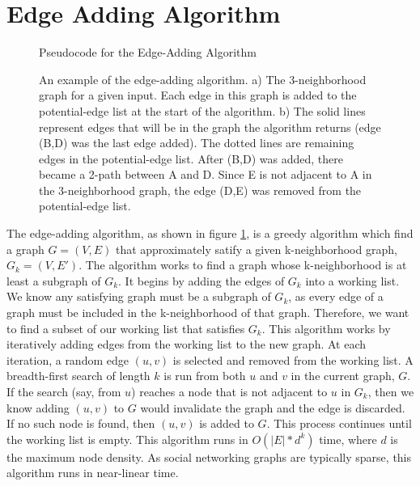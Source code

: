 \section{Edge Adding Algorithm}


\begin{figure}[H]
	\begin{algorithmic}
		\renewcommand{\algorithmicrequire}{\textbf{Input:}}
		\renewcommand{\algorithmicensure}{\textbf{Output:}}
			\EndIf
			\EndIf
		\EndWhile
	\end{algorithmic}
	\caption{Pseudocode for the Edge-Adding Algorithm}
	\caption{An example of the edge-adding algorithm. a) The 3-neighborhood graph for a given input. Each edge in this graph is added to the potential-edge list at the start of the algorithm. b) The solid lines represent edges that will be in the graph the algorithm returns (edge (B,D) was the last edge added). The dotted lines are remaining edges in the potential-edge list. After (B,D) was added, there became a 2-path between A and D. Since E is not adjacent to A in the 3-neighborhood graph, the edge (D,E) was removed from the potential-edge list.}
	\label{fig:edge-adding}
\end{figure}


\indent The edge-adding algorithm, as shown in figure \ref{fig:edge-adding}, is a greedy algorithm which find a graph $G = (V,E)$ that approximately satify a given k-neighborhood graph, $G_k = (V, E')$. The algorithm works to find a graph whose k-neighborhood is at least a subgraph of $G_k$. It begins by adding the edges of $G_k$ into a working list. We know any satisfying graph must be a subgraph of $G_k$, as every edge of a graph must be included in the k-neighborhood of that graph. Therefore, we want to find a subset of our working list that satisfies $G_k$. This algorithm works by iteratively adding edges from the working list to the new graph.  At each iteration, a random edge $(u,v)$ is selected and removed from the working list. A breadth-first search of length $k$ is run from both $u$ and $v$ in the current graph, $G$. If the search (say, from $u$) reaches a node that is not adjacent to $u$ in $G_k$, then we know adding $(u,v)$ to $G$ would invalidate the graph and the edge is discarded. If no such node is found, then $(u,v)$ is added to $G$. This process continues until the working list is empty. This algorithm runs in $O(|E|*d^k)$ time, where $d$ is the maximum node density. As social networking graphs are typically sparse, this algorithm runs in near-linear time.

